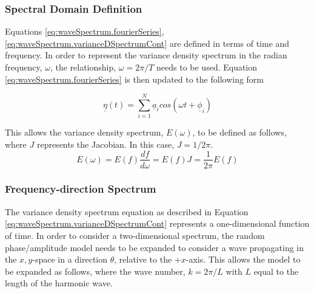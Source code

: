 



\subsubsection{Spectral Domain Definition} \label{subsec:theory.waves.waveSpectrum.spectralDef}
Equations \ref{eq:waveSpectrum.fourierSeries},\ref{eq:waveSpectrum.varianceDSpectrumCont} are defined in terms of time and frequency. In order to represent the variance density spectrum in the radian frequency, $\omega$, the relationship, $\omega = 2\pi/T$ needs to be used. Equation \ref{eq:waveSpectrum.fourierSeries} is then updated to the following form

\begin{equation} \label{eq:waveSpectrum.fourierSeries_omega}
    \underline{\eta}(t) = \sum_{i=1}^{N}\underline{a}_{i}cos(\omega t + \underline{\phi}_{i})
\end{equation}

This allows the variance density spectrum, $E(\omega)$, to be defined as follows, where $J$ represents the Jacobian. In this case, $J=1/2\pi$.
\begin{equation} \label{eq:waveSpectrum.relateE(f)toE(w)}
    E(\omega) =  E(f) \frac{df}{d\omega} = E(f)J = \frac{1}{2\pi}E(f)
\end{equation}

\subsubsection{Frequency-direction Spectrum} \label{subsec:theory.waves.waveSpectrum.freqDirection}
The variance density spectrum equation as described in Equation \ref{eq:waveSpectrum.varianceDSpectrumCont} represents a one-dimensional function of time. In order to consider a two-dimensional spectrum, the random phase/amplitude model needs to be expanded to consider a wave propagating in the $x,y$-space in a direction $\theta$, relative to the +$x$-axis. This allows the model to be expanded as follows, where the wave number, $k = 2\pi/L$ with $L$ equal to the length of the harmonic wave.


